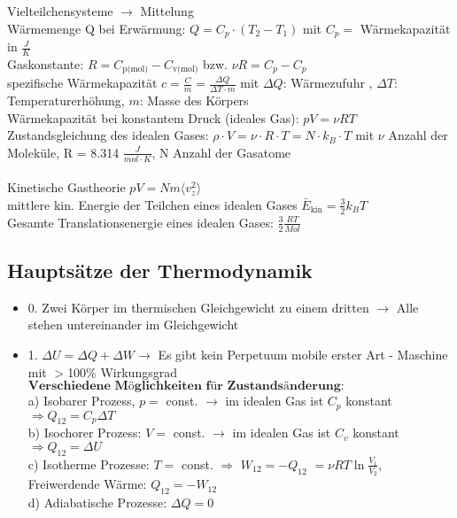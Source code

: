 \documentclass[fs, footer]{latex4ei}
\begin{document}
\begin{multicols*}{4}


Vielteilchensysteme $\rightarrow$ Mittelung\\

Wärmemenge Q bei Erwärmung: $Q = C_p\cdot (T_2 - T_1)$ mit $C_p =$ Wärmekapazität in $\frac{J}{K}$\\
Gaskonstante: $R = C_{\text{p(mol)}} - C_{\text{v(mol)}}$ bzw. $\nu R = C_p - C_p$\\
spezifische Wärmekapazität $c = \frac{C}{m} = \frac{\Delta Q}{\Delta T\cdot m}$ mit $\Delta Q$: Wärmezufuhr , $\Delta T$: Temperaturerhöhung, $m$: Masse des Körpers\\
Wärmekapazität bei konstantem Druck (ideales Gas): $pV = \nu RT$\\

Zustandsgleichung des idealen Gases: $\rho\cdot V  = \nu\cdot R\cdot T = N\cdot k_B\cdot T$ mit $\nu$ Anzahl der Moleküle, R = 8.314 $\frac{J}{mol\cdot K}$, N Anzahl der Gasatome\\%
\\Kinetische Gastheorie $pV = Nm\langle v_z^2 \rangle$\\
mittlere kin. Energie der Teilchen eines idealen Gases $\bar{E}_{\text{kin}} = \frac{3}{2}k_B T$\\
Gesamte Translationsenergie eines idealen Gases: $\frac{3}{2}\frac{RT}{Mol}$\\

\subsection{Hauptsätze der Thermodynamik}
\begin{itemize}
\item 0. Zwei Körper im thermischen Gleichgewicht zu einem dritten $\rightarrow$ Alle stehen untereinander im Gleichgewicht\\
\item 1. $\Delta U = \Delta Q + \Delta W \rightarrow $ Es gibt kein Perpetuum mobile erster Art - Maschine mit $>$100\% Wirkungsgrad\\
$\textbf{Verschiedene Möglichkeiten für Zustandsänderung:}$\\
a) Isobarer Prozess, $p =$ const. $\rightarrow$ im idealen Gas ist $C_p$ konstant $\Rightarrow Q_{12} = C_p \Delta T$\\
b) Isochorer Prozess: $V =$ const. $\rightarrow$ im idealen Gas ist $C_v$ konstant $\Rightarrow Q_{12} = \Delta U$\\
c) Isotherme Prozesse: $T =$ const. $\Rightarrow$ $W_{12} = -Q_{12}$ %
$ =\nu RT \ln\frac{V_1}{V_2}$, Freiwerdende Wärme: $Q_{12} = -W_{12}$\\
d) Adiabatische Prozesse: $\Delta Q = 0$


\end{itemize}
\end{multicols*}
\end{document}
